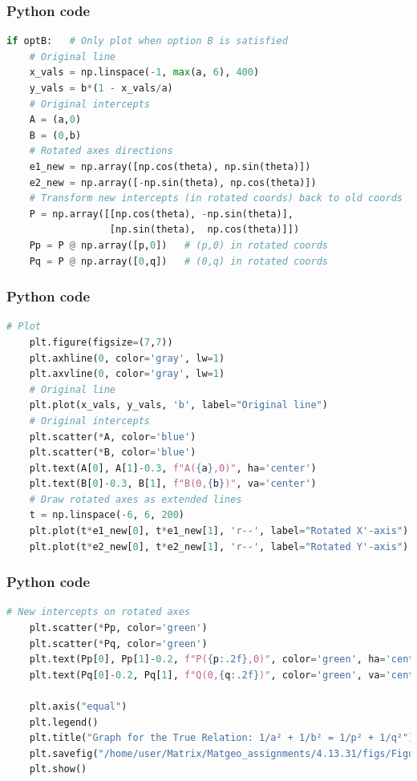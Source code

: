 \documentclass{beamer}
\begin{document}
\begin{frame}[fragile]
    \frametitle{Python code}

    \begin{lstlisting}[language=Python]
if optB:   # Only plot when option B is satisfied
    # Original line
    x_vals = np.linspace(-1, max(a, 6), 400)
    y_vals = b*(1 - x_vals/a)
    # Original intercepts
    A = (a,0)
    B = (0,b)
    # Rotated axes directions
    e1_new = np.array([np.cos(theta), np.sin(theta)])
    e2_new = np.array([-np.sin(theta), np.cos(theta)])
    # Transform new intercepts (in rotated coords) back to old coords
    P = np.array([[np.cos(theta), -np.sin(theta)],
                  [np.sin(theta),  np.cos(theta)]])
    Pp = P @ np.array([p,0])   # (p,0) in rotated coords
    Pq = P @ np.array([0,q])   # (0,q) in rotated coords
    \end{lstlisting}
    
\end{frame}

\begin{frame}[fragile]
    \frametitle{Python code}

    \begin{lstlisting}[language=Python]
    # Plot
    plt.figure(figsize=(7,7))
    plt.axhline(0, color='gray', lw=1)
    plt.axvline(0, color='gray', lw=1)
    # Original line
    plt.plot(x_vals, y_vals, 'b', label="Original line")
    # Original intercepts
    plt.scatter(*A, color='blue')
    plt.scatter(*B, color='blue')
    plt.text(A[0], A[1]-0.3, f"A({a},0)", ha='center')
    plt.text(B[0]-0.3, B[1], f"B(0,{b})", va='center')
    # Draw rotated axes as extended lines
    t = np.linspace(-6, 6, 200)
    plt.plot(t*e1_new[0], t*e1_new[1], 'r--', label="Rotated X'-axis")
    plt.plot(t*e2_new[0], t*e2_new[1], 'r--', label="Rotated Y'-axis")

    \end{lstlisting}
    
\end{frame}

\begin{frame}[fragile]
    \frametitle{Python code}

    \begin{lstlisting}[language=Python]
  # New intercepts on rotated axes
    plt.scatter(*Pp, color='green')
    plt.scatter(*Pq, color='green')
    plt.text(Pp[0], Pp[1]-0.2, f"P({p:.2f},0)", color='green', ha='center')
    plt.text(Pq[0]-0.2, Pq[1], f"Q(0,{q:.2f})", color='green', va='center')

    plt.axis("equal")
    plt.legend()
    plt.title("Graph for the True Relation: 1/a² + 1/b² = 1/p² + 1/q²")
    plt.savefig("/home/user/Matrix/Matgeo_assignments/4.13.31/figs/Figure_1")
    plt.show()
    \end{lstlisting}
    
\end{frame}
\end{document}
